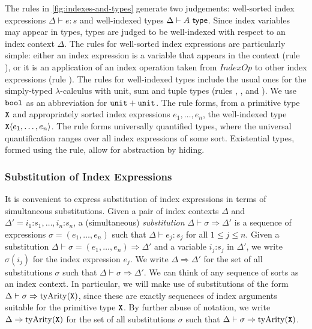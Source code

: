 \documentclass{sigplanconf}
\newcommand{\IndexOpSet}{\mathit{IndexOp}}
\newcommand{\tyPrim}[2]{\textup{\texttt{#1}}\langle #2 \rangle}
\newcommand{\tyPrimNm}[1]{\textup{\texttt{#1}}}
\newcommand{\primTyArity}{\mathrm{tyArity}}
\newcommand{\isType}{\textup{\textsf{ type}}}
\theoremstyle{examplestyle}
\theoremstyle{restatementstyle}
\begin{document}
The rules in \autoref{fig:indexes-and-types}
generate two judgements: well-sorted index expressions $\Delta \vdash
e : s$ and well-indexed types $\Delta \vdash A \isType$. Since index
variables may appear in types, types are judged to be well-indexed
with respect to an index context $\Delta$. The rules for well-sorted
index expressions are particularly simple: either an index expression
is a variable that appears in the context (rule ), or it
is an application of an index operation taken from $\IndexOpSet$ to
other index expressions (rule ). 
The rules for well-indexed types include the usual ones
for
the simply-typed $\lambda$-calculus with unit, sum and tuple types
(rules , ,  and
). 
We use $\tyPrimNm{bool}$ as an abbreviation for $\tyPrimNm{unit} + \tyPrimNm{unit}$.
The rule  %
forms, from a primitive type $\tyPrimNm{X}$ and appropriately sorted
index expressions $e_1,\ldots,e_n$, the well-indexed type
$\tyPrim{X}{e_1,\ldots,e_n}$. The rule  
forms universally quantified types, where the universal
quantification ranges over all index expressions of some
sort. Existential types, %
formed using the  rule,
allow for abstraction by hiding. %

\subsubsection{Substitution of Index Expressions}
\label{sec:simultaneous-substitution}

It %
is convenient to express substitution of index
expressions %
in terms of simultaneous substitutions.
Given a pair of index contexts $\Delta$ and $\Delta' = i_1 \mathord:
s_1, \ldots, i_n \mathord: s_n$, a (simultaneous) \emph{substitution}
$\Delta \vdash \sigma \Rightarrow \Delta'$ is a sequence of
expressions $\sigma = (e_1,\ldots,e_n)$ such that $\Delta \vdash e_j :
s_j$ for all $1 \leq j \leq n$. Given a substitution
$\Delta \vdash \sigma = (e_1,\ldots,e_n) \Rightarrow \Delta'$ and a
variable $i_j \mathord: s_j$ in $\Delta'$, we write $\sigma(i_j)$ for
the index expression $e_j$. We write $\Delta \Rightarrow \Delta'$ for
the set of all substitutions $\sigma$ such that $\Delta
\vdash \sigma \Rightarrow \Delta'$.
%
We can think of any sequence of sorts as an index
context. In particular, we will make use of substitutions
of the form $\Delta \vdash \sigma \Rightarrow
\primTyArity(\tyPrimNm{X})$, since these are exactly sequences of
index arguments suitable for the primitive type $\tyPrimNm{X}$. By
further abuse of notation, we write $\Delta \Rightarrow
\primTyArity(\tyPrimNm{X})$ for the set of all 
substitutions $\sigma$ such that $\Delta \vdash \sigma \Rightarrow
\primTyArity(\tyPrimNm{X})$.
\end{document}
